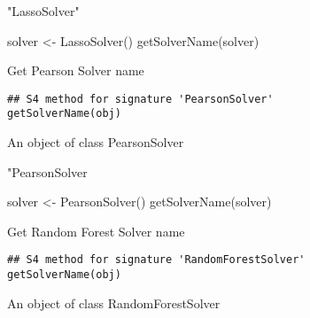 \documentclass[a4paper]{book}
\begin{document}
%
\begin{Value}
"LassoSolver"
\end{Value}
%
\begin{Examples}
\begin{ExampleCode}
solver <- LassoSolver()
getSolverName(solver)
\end{ExampleCode}
\end{Examples}
%
\begin{Description}\relax
Get Pearson Solver name
\end{Description}
%
\begin{Usage}
\begin{verbatim}
## S4 method for signature 'PearsonSolver'
getSolverName(obj)
\end{verbatim}
\end{Usage}
%
\begin{Arguments}
\begin{ldescription}
\item[\code{obj}] An object of class PearsonSolver
\end{ldescription}
\end{Arguments}
%
\begin{Value}
"PearsonSolver
\end{Value}
%
\begin{Examples}
\begin{ExampleCode}
solver <- PearsonSolver()
getSolverName(solver)
\end{ExampleCode}
\end{Examples}
%
\begin{Description}\relax
Get Random Forest Solver name
\end{Description}
%
\begin{Usage}
\begin{verbatim}
## S4 method for signature 'RandomForestSolver'
getSolverName(obj)
\end{verbatim}
\end{Usage}
%
\begin{Arguments}
\begin{ldescription}
\item[\code{obj}] An object of class RandomForestSolver
\end{ldescription}
\end{Arguments}
\end{document}
